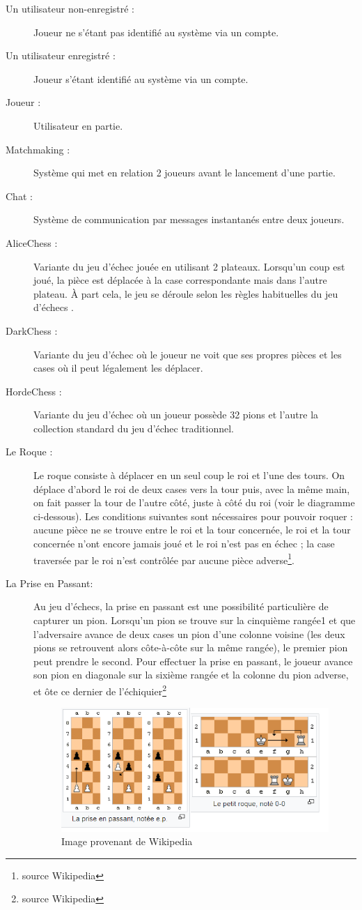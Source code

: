 \documentclass[10pt, a4paper]{article}
\begin{document}
		\begin{description}
		\item[Un utilisateur non-enregistré :] Joueur ne s'étant pas identifié au système via un compte.
		\item[Un utilisateur enregistré :] Joueur s'étant identifié au système via un compte.
		\item[Joueur :] Utilisateur en partie.
		\item[Matchmaking :] Système qui met en relation 2 joueurs avant le lancement d'une partie.
		\item[Chat :] Système de communication par messages instantanés entre deux joueurs.
		\item[AliceChess :] Variante du jeu d'échec jouée en utilisant 2 plateaux. Lorsqu'un coup est joué, la pièce est déplacée à la case correspondante mais dans l'autre plateau. À part cela, le jeu se déroule selon les règles habituelles du jeu d'échecs .
		\item[DarkChess :] Variante du jeu d'échec où le joueur ne voit que ses propres pièces et les cases où il peut légalement les déplacer.
		\item[HordeChess :] Variante du jeu d'échec où un joueur possède 32 pions et l'autre la collection standard du jeu d'échec traditionnel.
		\item[Le Roque :] Le roque consiste à déplacer en un seul coup le roi et l'une des tours. On déplace d'abord le roi de deux cases vers la tour puis, avec la même main, on fait passer la tour de l'autre côté, juste à côté du roi (voir le diagramme ci-dessous). Les conditions suivantes sont nécessaires pour pouvoir roquer : aucune pièce ne se trouve entre le roi et la tour concernée, le roi et la tour concernée n'ont encore jamais joué et le roi n'est pas en échec ;
la case traversée par le roi n'est contrôlée par aucune pièce adverse\footnote{source Wikipedia}.
		\item[La Prise en Passant:] Au jeu d’échecs, la prise en passant est une possibilité particulière de capturer un pion. Lorsqu’un pion se trouve sur la cinquième rangée1 et que l’adversaire avance de deux cases un pion d’une colonne voisine (les deux pions se retrouvent alors côte-à-côte sur la même rangée), le premier pion peut prendre le second. Pour effectuer la prise en passant, le joueur avance son pion en diagonale sur la sixième rangée et la colonne du pion adverse, et ôte ce dernier de l’échiquier\footnote{source Wikipedia}
		\begin{figure}[b]
		\includegraphics[scale=1]{roque_prise_passant.png}
		\caption{Image provenant de Wikipedia}
		\end{figure}
		

\end{description}
\end{document}

